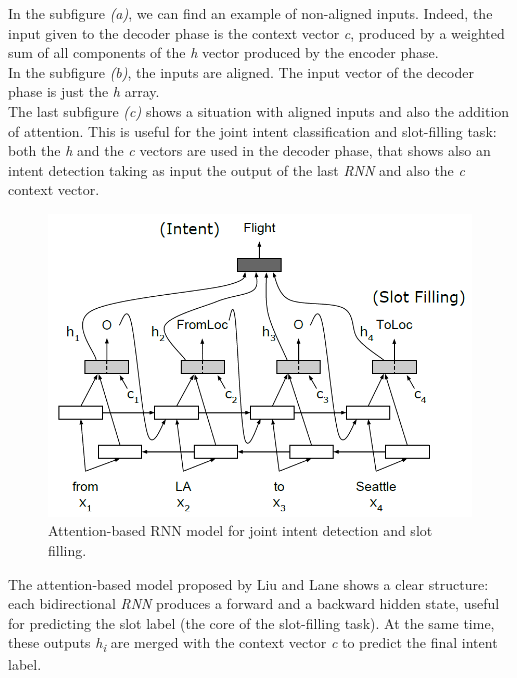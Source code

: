 \documentclass[a4paper,12pt]{report}
\begin{document}
	In the subfigure \textit{(a)}, we can find an example of non-aligned inputs. Indeed, the input given to the decoder phase is the context vector \textit{c}, produced by a weighted sum of all components of the \textit{h} vector produced by the encoder phase.\\
	In the subfigure \textit{(b)}, the inputs are aligned. The input vector of the decoder phase is just the \textit{h} array.\\
	The last subfigure \textit{(c)} shows a situation with aligned inputs and also the addition of attention. This is useful for the joint intent classification and slot-filling task: both the \textit{h} and the \textit{c} vectors are used in the decoder phase, that shows also an intent detection taking as input the output of the last \textit{RNN} and also the \textit{c} context vector.
	\begin{figure}[H]
		\centering
		\includegraphics[scale=0.4]{alt2}
		\caption{Attention-based RNN model for joint intent detection
			and slot filling.}
	\end{figure}
	The attention-based model proposed by Liu and Lane shows a clear structure: each bidirectional \textit{RNN} produces a forward and a backward hidden state, useful for predicting the slot label (the core of the slot-filling task). At the same time, these outputs \textit{h\textsubscript{i}} are merged with the context vector \textit{c} to predict the final intent label.
	
\end{document}
